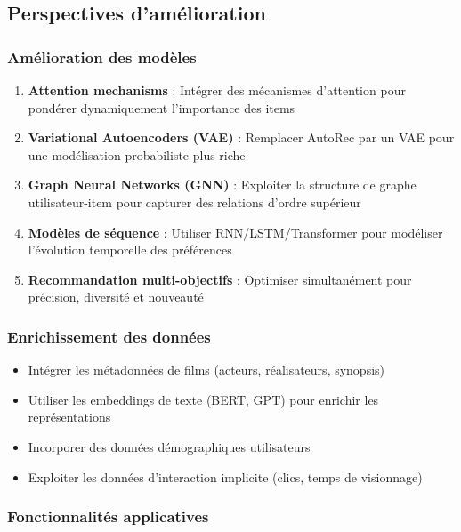 \documentclass[12pt,a4paper]{article}
\begin{document}
\subsection{Perspectives d'amélioration}

\subsubsection{Amélioration des modèles}

\begin{enumerate}
    \item \textbf{Attention mechanisms} : Intégrer des mécanismes d'attention pour pondérer dynamiquement l'importance des items
    
    \item \textbf{Variational Autoencoders (VAE)} : Remplacer AutoRec par un VAE pour une modélisation probabiliste plus riche
    
    \item \textbf{Graph Neural Networks (GNN)} : Exploiter la structure de graphe utilisateur-item pour capturer des relations d'ordre supérieur
    
    \item \textbf{Modèles de séquence} : Utiliser RNN/LSTM/Transformer pour modéliser l'évolution temporelle des préférences
    
    \item \textbf{Recommandation multi-objectifs} : Optimiser simultanément pour précision, diversité et nouveauté
\end{enumerate}

\subsubsection{Enrichissement des données}

\begin{itemize}
    \item Intégrer les métadonnées de films (acteurs, réalisateurs, synopsis)
    \item Utiliser les embeddings de texte (BERT, GPT) pour enrichir les représentations
    \item Incorporer des données démographiques utilisateurs
    \item Exploiter les données d'interaction implicite (clics, temps de visionnage)
\end{itemize}

\subsubsection{Fonctionnalités applicatives}
\end{document}
